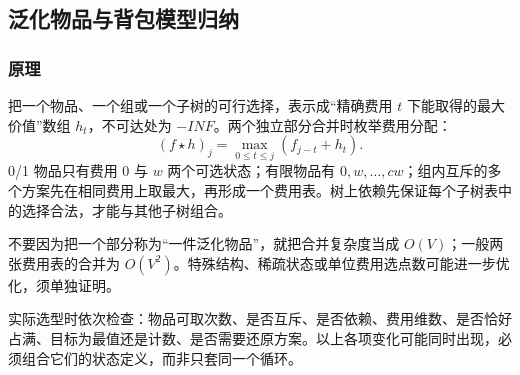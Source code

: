 \subsection{泛化物品与背包模型归纳}
\label{dp:generalized-knapsack}
\subsubsection*{原理}

把一个物品、一个组或一个子树的可行选择，表示成“精确费用 $t$ 下能取得的最大价值”数组 $h_t$，不可达处为 $-INF$。两个独立部分合并时枚举费用分配：
\[
 (f\star h)_j=\max_{0\le t\le j}(f_{j-t}+h_t).
\]
0/1 物品只有费用 0 与 $w$ 两个可选状态；有限物品有 $0,w,\ldots,cw$；组内互斥的多个方案先在相同费用上取最大，再形成一个费用表。树上依赖先保证每个子树表中的选择合法，才能与其他子树组合。

不要因为把一个部分称为“一件泛化物品”，就把合并复杂度当成 $O(V)$；一般两张费用表的合并为 $O(V^2)$。特殊结构、稀疏状态或单位费用选点数可能进一步优化，须单独证明。

实际选型时依次检查：物品可取次数、是否互斥、是否依赖、费用维数、是否恰好占满、目标为最值还是计数、是否需要还原方案。以上各项变化可能同时出现，必须组合它们的状态定义，而非只套同一个循环。
